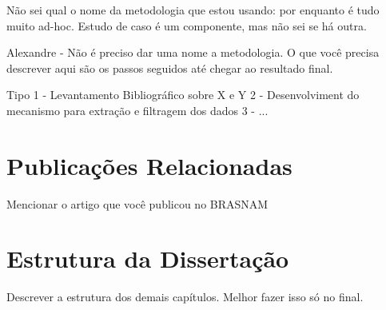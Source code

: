 Não sei qual o nome da metodologia que estou usando: por enquanto é tudo muito ad-hoc. Estudo de caso é um componente, mas não sei se há outra.

Alexandre -  Não é preciso dar uma nome a metodologia. O que você precisa descrever aqui são os passos seguidos até chegar ao resultado final.

Tipo
1 - Levantamento Bibliográfico sobre X e Y
2 - Desenvolviment do mecanismo para extração e filtragem dos dados
3 - ...

\section{Publicações Relacionadas}

Mencionar o artigo que você publicou no BRASNAM

\section{Estrutura da Dissertação}

Descrever a estrutura dos demais capítulos. Melhor fazer isso só no final.

